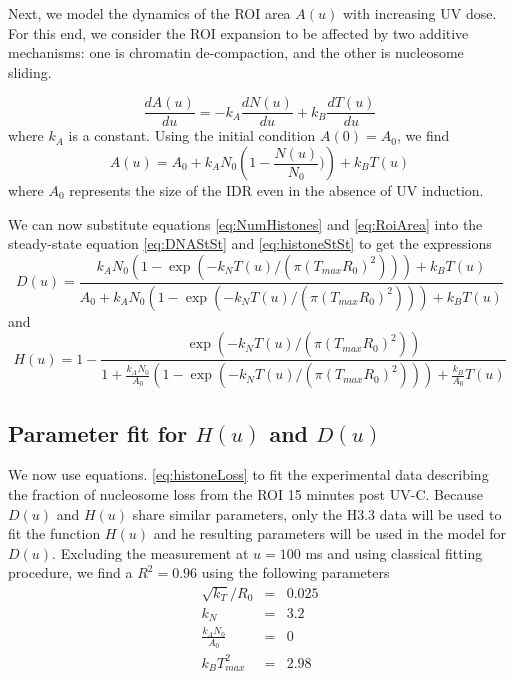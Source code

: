 \documentclass[12pt]{article}
\begin{document}
Next, we model the dynamics of the ROI area $A(u)$ with increasing UV dose.  For this end, we consider the ROI expansion to be affected by two additive mechanisms: one is chromatin de-compaction, and the other is nucleosome sliding. 

\begin{equation}\label{dralpha}
\frac{dA(u)}{du}=-k_A\frac{dN(u)}{du}+k_B\frac{dT(u)}{du}
\end{equation}
where $k_A$ is a constant. Using the initial condition $A(0)=A_0$, we find 
\begin{equation}\label{eq:RoiArea}
A(u) = A_0 +k_AN_0\left(1-\frac{N(u)}{N_0})\right) +k_BT(u)
\end{equation}
where $A_0$ represents the size of the IDR even in the absence of UV induction.

We can now substitute equations \ref{eq:NumHistones} and \ref{eq:RoiArea} into the steady-state equation \ref{eq:DNAStSt} and \ref{eq:histoneStSt} to get the expressions 
\begin{equation}
\label{eq:DnaLoss}
D(u) = \frac{k_AN_0\left(1-\exp\left(-k_NT(u)/(\pi(T_{max}R_0)^2)\right)\right) +k_BT(u)}{A_0+k_AN_0\left(1-\exp\left(-k_NT(u)/(\pi(T_{max}R_0)^2)\right)\right) +k_BT(u)}
\end{equation}
and 
\begin{equation}\label{eq:histoneLoss}
H(u) = 1- \frac{\exp\left(-k_NT(u)/(\pi(T_{max}R_0)^2) \right)}{1+\frac{k_AN_0}{A_0}\left(1-\exp\left(-k_NT(u)/(\pi(T_{max}R_0)^2) \right)\right) +\frac{k_B}{A_0}T(u)}
\end{equation}


\subsection{Parameter fit for $H(u)$ and $D(u)$ }\label{subsection:parameterFit}
We now use equations. \ref{eq:histoneLoss} to fit the experimental data describing the fraction of nucleosome loss from the ROI 15 minutes post UV-C. Because $D(u)$ and $H(u)$ share similar parameters, only the H3.3 data will be used to fit the function $H(u)$ and he resulting parameters will be used in the model for $D(u)$. 
Excluding the measurement at $u=100$ ms and using classical fitting procedure, we find a $R^2= 0.96$ using the following parameters
\begin{eqnarray*}
\sqrt{k_T}/R_0 &=&  0.025\\
k_N &=&  3.2\\
\frac{k_AN_0}{A_0}&=& 0\\
k_BT_{max}^2&=& 2.98
\end{eqnarray*}
\end{document}
